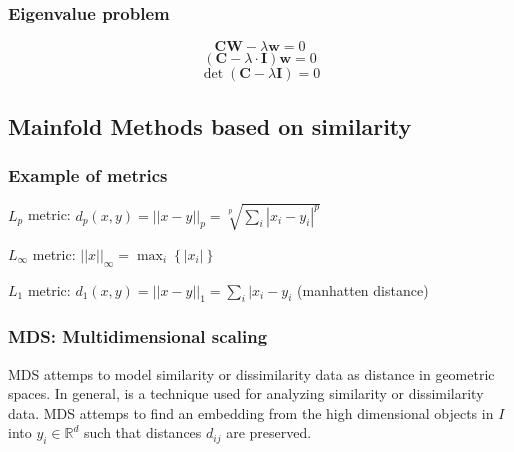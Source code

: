 \subsubsection{Eigenvalue problem}
\[
\mathbf{CW}-\lambda\mathbf{w} = 0
\]
\[
(\mathbf{C}-\lambda\cdot\mathbf{I})\mathbf{w} = 0
\]
\[
\det(\mathbf{C}-\lambda\mathbf{I}) = 0
\]
\subsection{Mainfold Methods based on similarity}
\subsubsection{Example of metrics}
\(L_p\) metric: \(d_p(x,y) = ||x-y||_p = \sqrt[p]{\sum_i|x_i-y_i|^p}\)

\(L_\infty\) metric: \(||x||_\infty = \max_i\left\{|x_i|\right\}\)

\(L_1\) metric: \(d_1(x,y) = ||x-y||_1 = \sum_i|x_i-y_i\) (manhatten distance)

\subsubsection{MDS: Multidimensional scaling}
MDS attemps to model similarity or dissimilarity data as distance in geometric spaces.
In general, is a technique used for analyzing similarity or dissimilarity data.
MDS attemps to find an embedding from the high dimensional objects in \(I\) into \(y_i \in \mathbb{R}^d\) such that distances \(d_{ij}\) are preserved.
